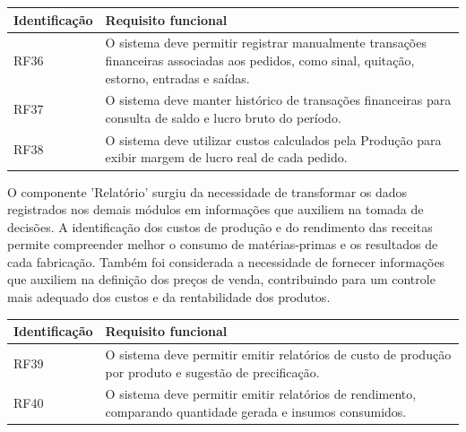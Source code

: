 \begin{quadro}
    \centering
    \label{quadro:rf_financas}

    \begin{tabular}{|p{3cm}|p{11cm}|}
        \hline
        \textbf{Identificação} & \textbf{Requisito funcional} \\ \hline

        RF36 & O sistema deve permitir registrar manualmente transações financeiras associadas aos pedidos, como sinal, quitação, estorno, entradas e saídas. \\ \hline

        RF37 & O sistema deve manter histórico de transações financeiras para consulta de saldo e lucro bruto do período. \\ \hline

        RF38 & O sistema deve utilizar custos calculados pela Produção para exibir margem de lucro real de cada pedido. \\ \hline
    \end{tabular}

    \vspace{0.2cm}
\end{quadro}

O componente 'Relatório' surgiu da necessidade de transformar os dados registrados nos demais módulos em informações que auxiliem na tomada de decisões. A identificação dos custos de produção e do rendimento das receitas permite compreender melhor o consumo de matérias-primas e os resultados de cada fabricação. Também foi considerada a necessidade de fornecer informações que auxiliem na definição dos preços de venda, contribuindo para um controle mais adequado dos custos e da rentabilidade dos produtos.

\begin{quadro}
    \centering
    \label{quadro:rf_relatorios}

    \begin{tabular}{|p{3cm}|p{11cm}|}
        \hline
        \textbf{Identificação} & \textbf{Requisito funcional} \\ \hline

        RF39 & O sistema deve permitir emitir relatórios de custo de produção por produto e sugestão de precificação. \\ \hline

        RF40 & O sistema deve permitir emitir relatórios de rendimento, comparando quantidade gerada e insumos consumidos. \\ \hline
    \end{tabular}

    \vspace{0.2cm}
\end{quadro}


